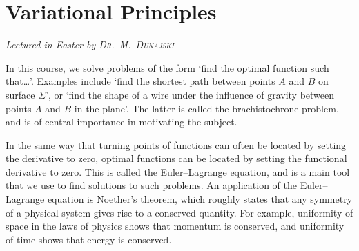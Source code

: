 \chapter[Variational Principles \\ \textnormal{\emph{Lectured in Easter \oldstylenums{2021} by \textsc{Dr.\ M.\ Dunajski}}}]{Variational Principles}
\emph{\Large Lectured in Easter  by \textsc{Dr.\ M.\ Dunajski}}

In this course, we solve problems of the form `find the optimal function such that\dots'.
Examples include `find the shortest path between points \( A \) and \( B \) on surface \( \Sigma \)', or `find the shape of a wire under the influence of gravity between points \( A \) and \( B \) in the plane'.
The latter is called the brachistochrone problem, and is of central importance in motivating the subject.

In the same way that turning points of functions can often be located by setting the derivative to zero, optimal functions can be located by setting the functional derivative to zero.
This is called the Euler--Lagrange equation, and is a main tool that we use to find solutions to such problems.
An application of the Euler--Lagrange equation is Noether's theorem, which roughly states that any symmetry of a physical system gives rise to a conserved quantity.
For example, uniformity of space in the laws of physics shows that momentum is conserved, and uniformity of time shows that energy is conserved.


